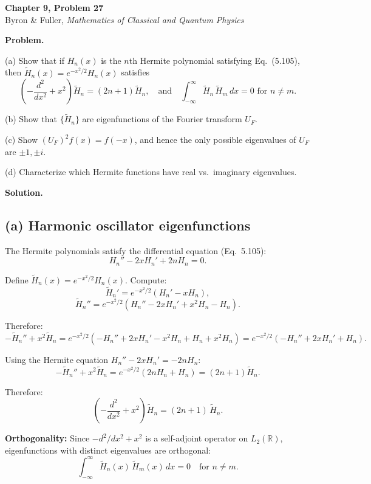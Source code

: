 \documentclass[12pt]{article}
\begin{document}
\begin{center}
{\Large\bfseries Chapter 9, Problem 27}\\[6pt]
Byron \& Fuller, \textit{Mathematics of Classical and Quantum Physics}
\end{center}

\bigskip

\textbf{Problem.}

(a) Show that if $H_n(x)$ is the $n$th Hermite polynomial satisfying Eq.~(5.105), then $\tilde{H}_n(x) = e^{-x^2/2}H_n(x)$ satisfies
\[
\left(-\frac{d^2}{dx^2} + x^2\right)\tilde{H}_n = (2n+1)\tilde{H}_n, \quad \text{and} \quad \int_{-\infty}^{\infty} \tilde{H}_n\,\tilde{H}_m\,dx = 0 \text{ for } n \neq m.
\]

(b) Show that $\{\tilde{H}_n\}$ are eigenfunctions of the Fourier transform $U_F$.

(c) Show $(U_F)^2 f(x) = f(-x)$, and hence the only possible eigenvalues of $U_F$ are $\pm 1, \pm i$.

(d) Characterize which Hermite functions have real vs.\ imaginary eigenvalues.

\bigskip
\textbf{Solution.}

\subsection*{(a) Harmonic oscillator eigenfunctions}

The Hermite polynomials satisfy the differential equation (Eq.~5.105):
\[
H_n'' - 2xH_n' + 2nH_n = 0.
\]

Define $\tilde{H}_n(x) = e^{-x^2/2}H_n(x)$. Compute:
\[
\tilde{H}_n' = e^{-x^2/2}(H_n' - xH_n),
\]
\[
\tilde{H}_n'' = e^{-x^2/2}(H_n'' - 2xH_n' + x^2 H_n - H_n).
\]

Therefore:
\[
-\tilde{H}_n'' + x^2\tilde{H}_n = e^{-x^2/2}(-H_n'' + 2xH_n' - x^2H_n + H_n + x^2H_n) = e^{-x^2/2}(-H_n'' + 2xH_n' + H_n).
\]

Using the Hermite equation $H_n'' - 2xH_n' = -2nH_n$:
\[
-\tilde{H}_n'' + x^2\tilde{H}_n = e^{-x^2/2}(2nH_n + H_n) = (2n+1)\tilde{H}_n.
\]

Therefore:
\[
\boxed{\left(-\frac{d^2}{dx^2} + x^2\right)\tilde{H}_n = (2n+1)\,\tilde{H}_n}.
\]

\textbf{Orthogonality:} Since $-d^2/dx^2 + x^2$ is a self-adjoint operator on $L_2(\mathbb{R})$, eigenfunctions with distinct eigenvalues are orthogonal:
\[
\int_{-\infty}^{\infty} \tilde{H}_n(x)\,\tilde{H}_m(x)\,dx = 0 \quad \text{for } n \neq m.
\]
\end{document}
